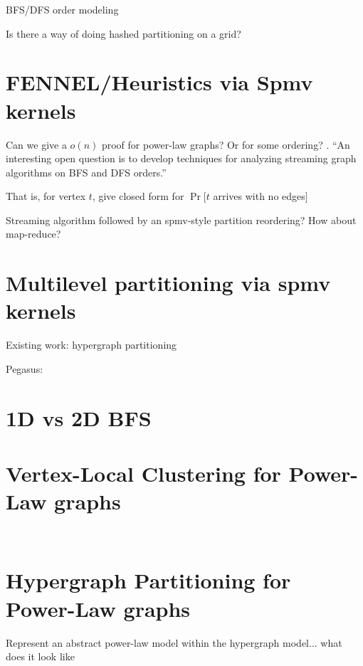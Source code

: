 \documentclass[11pt]{article}
\begin{document}
BFS/DFS order modeling

Is there a way of doing hashed partitioning on a grid?

\section{FENNEL/Heuristics via Spmv kernels}
Can we give a $o(n)$ proof for power-law graphs? Or for some ordering? \cite{DBLP:journals/corr/abs-1212-1121}. ``An interesting open question is to develop techniques for analyzing streaming graph algorithms on BFS and DFS orders.''

That is, for vertex $t$, give closed form for $\Pr[t $ arrives with no edges$]$

Streaming algorithm followed by an spmv-style partition reordering? How about map-reduce?

\section{Multilevel partitioning via spmv kernels}
Existing work: hypergraph partitioning

Pegasus: \cite{kang2009pegasus}


\section{1D vs 2D BFS}
\cite{Buluc:2011:PBS:2063384.2063471}

\section{Vertex-Local Clustering for Power-Law graphs}
\cite{Andersen:2009:FSC:1536414.1536449}




\begin{verbatim}

\end{verbatim}

\begin{verbatim}

\end{verbatim}

\section{Hypergraph Partitioning for Power-Law graphs}
Represent an abstract power-law model within the hypergraph model... what does it look like
\end{document}
